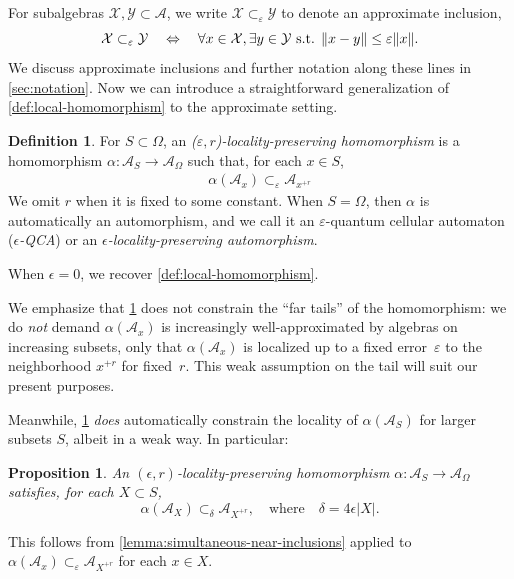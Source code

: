\documentclass[11pt,reqno]{amsart}
\newtheorem{proposition}[theorem]{Proposition}
\theoremstyle{definition}
\newtheorem{definition}[theorem]{Definition}
\theoremstyle{remark}
\numberwithin{equation}{section}
\newcommand{\eps}{\varepsilon}
\newcommand{\cA}{\mathcal A}
\newcommand{\cX}{\mathcal X}
\newcommand{\cY}{\mathcal Y}
\DeclarePairedDelimiter\norm{\lVert}{\rVert}
\newcommand{\approxSub}[1]{\subset_{#1}}
\begin{document}
For subalgebras $\cX, \cY \subset \cA$, we write $\cX \subset_\eps \cY$ to denote an approximate inclusion,
\begin{equation*}
    \cX \approxSub{\eps} \cY  \quad \Leftrightarrow \quad  \forall x \in \cX, \exists y \in \cY \text{ s.t. } \norm{x-y} \leq \eps \norm{x}.
\end{equation*}
We discuss approximate inclusions and further notation along these lines in \cref{sec:notation}.
Now we can introduce a straightforward generalization of \cref{def:local-homomorphism} to the approximate setting.

\begin{definition}\label{def:eps-local-homomorphism}
    For $S \subset \Omega$, an \emph{($\eps,r$)-locality-preserving homomorphism} is a homomorphism $\alpha : \cA_S \to \cA_\Omega$ such that, for each $x \in S$,
    \begin{align} \label{eq:approx-LP}
        \alpha(\cA_x) \subset_\eps \cA_{x^{+r}}
    \end{align}
    We omit $r$ when it is fixed to some constant.
    When $S = \Omega$, then $\alpha$ is automatically an automorphism, and we call it an $\eps$-quantum cellular automaton (\emph{$\epsilon$-QCA}) or an \emph{$\epsilon$-locality-preserving automorphism}.
\end{definition}
\noindent
When $\epsilon=0$, we recover \cref{def:local-homomorphism}.

We emphasize that \cref{def:eps-local-homomorphism} does not constrain the ``far tails'' of the homomorphism: we do \emph{not} demand $\alpha(\cA_x)$ is increasingly well-approximated by algebras on increasing subsets, only that $\alpha(\cA_x)$ is localized up to a fixed error~$\eps$ to the neighborhood $x^{+r}$ for fixed~$r$. This weak assumption on the tail will suit our present purposes.

 Meanwhile, \cref{def:eps-local-homomorphism} \textit{does} automatically constrain the locality of $\alpha(\cA_S)$ for larger subsets $S$, albeit in a weak way.
 In particular:
\begin{proposition}\label{prop:extend-locality}
    An $(\epsilon,r)$-locality-preserving homomorphism $\alpha : \cA_S \to \cA_\Omega$ satisfies, for each $X \subset S$,
    \begin{equation*}
        \alpha(\cA_{X}) \subset_\delta \cA_{X^{+r}}, \quad \text{where} \quad \delta = 4 \epsilon |X|.
    \end{equation*}
\end{proposition}
\noindent
This follows from \cref{lemma:simultaneous-near-inclusions} applied to $\alpha(\cA_x) \subset_\eps \cA_{X^{+r}}$ for each $x \in X$.
\end{document}
